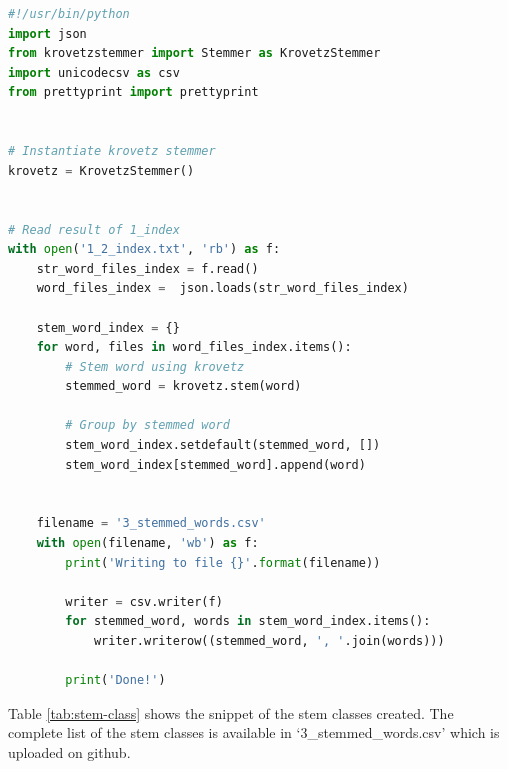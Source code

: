 \documentclass[letterpaper,11pt]{article}
\begin{document}
\begin{lstlisting}[language=python, caption={Creating Stem Classes with Krovetz Stemmer}, label={lst:krovetz}]
#!/usr/bin/python
import json
from krovetzstemmer import Stemmer as KrovetzStemmer
import unicodecsv as csv
from prettyprint import prettyprint


# Instantiate krovetz stemmer
krovetz = KrovetzStemmer()


# Read result of 1_index
with open('1_2_index.txt', 'rb') as f:
    str_word_files_index = f.read()
    word_files_index =  json.loads(str_word_files_index)

    stem_word_index = {}
    for word, files in word_files_index.items():
        # Stem word using krovetz
        stemmed_word = krovetz.stem(word)

        # Group by stemmed word
        stem_word_index.setdefault(stemmed_word, [])
        stem_word_index[stemmed_word].append(word)


    filename = '3_stemmed_words.csv'
    with open(filename, 'wb') as f:
        print('Writing to file {}'.format(filename))

        writer = csv.writer(f)
        for stemmed_word, words in stem_word_index.items():
            writer.writerow((stemmed_word, ', '.join(words)))

        print('Done!')

\end{lstlisting}

Table \ref{tab:stem-class} shows the snippet of the stem classes created. The complete list of the stem classes is available in `3\_stemmed\_words.csv' which is uploaded on github. 
\end{document}
